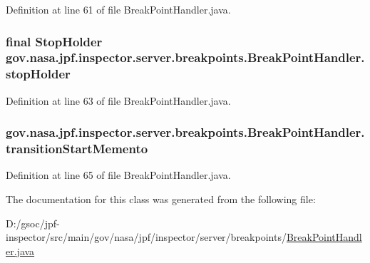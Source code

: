 Definition at line 61 of file Break\+Point\+Handler.\+java.

\subsubsection[{\texorpdfstring{stop\+Holder}{stopHolder}}]{\setlength{\rightskip}{0pt plus 5cm}final {\bf Stop\+Holder} gov.\+nasa.\+jpf.\+inspector.\+server.\+breakpoints.\+Break\+Point\+Handler.\+stop\+Holder\hspace{0.3cm}{\ttfamily [protected]}}\hypertarget{classgov_1_1nasa_1_1jpf_1_1inspector_1_1server_1_1breakpoints_1_1_break_point_handler_ad9dd2efe1d9825c05a6c98e9d35ee459}{}\label{classgov_1_1nasa_1_1jpf_1_1inspector_1_1server_1_1breakpoints_1_1_break_point_handler_ad9dd2efe1d9825c05a6c98e9d35ee459}


Definition at line 63 of file Break\+Point\+Handler.\+java.

\subsubsection[{\texorpdfstring{transition\+Start\+Memento}{transitionStartMemento}}]{ gov.\+nasa.\+jpf.\+inspector.\+server.\+breakpoints.\+Break\+Point\+Handler.\+transition\+Start\+Memento\hspace{0.3cm}{\ttfamily [private]}}\hypertarget{classgov_1_1nasa_1_1jpf_1_1inspector_1_1server_1_1breakpoints_1_1_break_point_handler_ab03b8dcde0887de59f690b844766d59f}{}\label{classgov_1_1nasa_1_1jpf_1_1inspector_1_1server_1_1breakpoints_1_1_break_point_handler_ab03b8dcde0887de59f690b844766d59f}


Definition at line 65 of file Break\+Point\+Handler.\+java.



The documentation for this class was generated from the following file\+:\begin{DoxyCompactItemize}
\item 
D\+:/gsoc/jpf-\/inspector/src/main/gov/nasa/jpf/inspector/server/breakpoints/\hyperlink{_break_point_handler_8java}{Break\+Point\+Handler.\+java}\end{DoxyCompactItemize}
